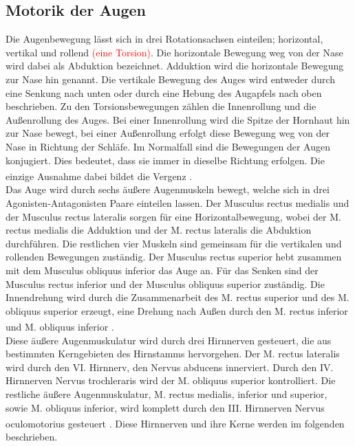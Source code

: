 \documentclass[12pt,a4paper,pdftex]{article}
\begin{document}
\subsection{Motorik der Augen} 
Die Augenbewegung lässt sich in drei Rotationsachsen einteilen; horizontal, vertikal und rollend \textcolor{red}{(eine Torsion)}. Die horizontale Bewegung weg von der Nase wird dabei als Abduktion bezeichnet. Adduktion wird die horizontale Bewegung zur Nase hin genannt. Die vertikale Bewegung des Auges wird entweder durch eine Senkung nach unten oder durch eine Hebung des Augapfels nach oben beschrieben. Zu den Torsionsbewegungen zählen die Innenrollung und die Außenrollung des Auges. Bei einer Innenrollung wird die Spitze der Hornhaut hin zur Nase bewegt, bei einer Außenrollung erfolgt diese Bewegung weg von der Nase in Richtung der Schläfe. Im Normalfall sind die Bewegungen der Augen konjugiert. Dies bedeutet, dass sie immer in dieselbe Richtung erfolgen. Die einzige Ausnahme dabei bildet die Vergenz \textsuperscript{\cite[39]{kandel2013principles}}. \\
Das Auge wird durch sechs äußere Augenmuskeln bewegt, welche sich in drei Agonisten-Antagonisten Paare einteilen lassen. Der Musculus rectus medialis und der Musculus rectus lateralis sorgen für eine Horizontalbewegung, wobei der M. rectus medialis die Adduktion und der M. rectus lateralis die Abduktion durchführen. Die restlichen vier Muskeln sind gemeinsam für die vertikalen und rollenden Bewegungen zuständig. Der Musculus rectus superior hebt zusammen mit dem Musculus obliquus inferior das Auge an. Für das Senken sind der Musculus rectus inferior und der Musculus obliquus superior zuständig. Die Innendrehung wird durch die Zusammenarbeit des M. rectus superior und des M. obliquus superior erzeugt, eine Drehung nach Außen durch den M. rectus inferior und M. obliquus inferior \textsuperscript{\cite[39]{kandel2013principles}}. \\  
Diese äußere Augenmuskulatur wird durch drei Hirnnerven gesteuert, die aus bestimmten Kerngebieten des Hirnstamms hervorgehen. Der M. rectus lateralis wird durch den VI. Hirnnerv, den Nervus abducens innerviert. Durch den IV. Hirnnerven Nervus trochleraris wird der M. obliquus superior kontrolliert. Die restliche äußere Augenmuskulatur, M. rectus medialis, inferior und superior, sowie M. obliquus inferior, wird komplett durch den III. Hirnnerven Nervus oculomotorius gesteuert \textsuperscript{\cite[39]{kandel2013principles}}. Diese Hirnnerven und ihre Kerne werden im folgenden beschrieben.   
\end{document}
